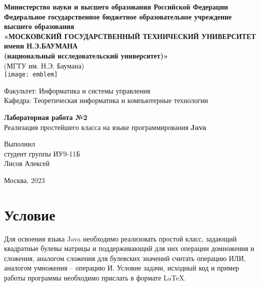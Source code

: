 \documentclass[12pt,a4paper,oneside,titlepage] {article}
\begin{document}
\begin{center}
  \hfill 
  \break
  \textbf{
    \footnotesize{Министерство науки и высшего образования Российской Федерации}\\
    \hfill \break
    \footnotesize{Федеральное государственное бюджетное образовательное учреждение высшего образования}\\
    \small{«МОСКОВСКИЙ ГОСУДАРСТВЕННЫЙ ТЕХНИЧЕСКИЙ УНИВЕРСИТЕТ имени Н.Э.БАУМАНА\\(национальный исследовательский университет)»}}\\
    \footnotesize{(МГТУ им. Н.Э. Баумана)}\\
    \texttt{[image: emblem]}
\end{center}
\hfill 
\break
\normalsize{Факультет: Информатика и системы управления}\\
\hfill \break
\normalsize{Кафедра: Теоретическая информатика и компьютерные технологии}\\
\hfill\break
\begin{center}
  \textbf{\large{Лабораторная работа №2}}\\
  \large{Реализация простейшего класса на языке программирования \bfseries{Java}}\\
\end{center}
\hfill \break
\hfill \break
\hfill \break
\begin{flushright}
  \normalsize{
    Выполнил\\
    студент группы ИУ9-11Б\\
    Лисов Алексей
  }
\end{flushright}
\hfill \break
\hfill \break
\hfill \break
\hfill \break
\hfill \break
\hfill \break

\begin{center} Москва, 2023 \end{center}
\thispagestyle{empty} %

\section{Условие}
Для освоения языка Java необходимо реализовать простой класс, задающий квадратные булевы матрицы и поддерживающий для них операции домножения и сложения, аналогом сложения для булевских значений считать операцию ИЛИ, аналогом умножения – операцию И. Условие задачи, исходный
код и пример работы программы необходимо прислать в формате \LaTeX.
\end{document}
